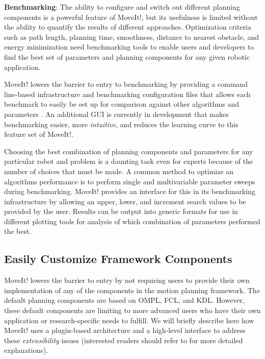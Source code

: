 \documentclass[10pt,journal,compsoc]{joser1}
\begin{document}
{{\bf Benchmarking}: The ability to configure and switch out different planning
components is a powerful feature of MoveIt!, but its usefulness is limited
without the ability to quantify the results of different approaches.
Optimization criteria such as path length, planning time, smoothness, distance
to nearest obstacle, and energy minimization need benchmarking tools to enable
users and developers to find the best set of parameters and planning components
for any given robotic application.

MoveIt! lowers the barrier to entry to benchmarking by providing a command
line-based infrastructure and benchmarking configuration files that allows each
benchmark to easily be set up for comparison against other algorithms and
parameters \cite{cohen2012generic}. An additional GUI is currently in
development that makes benchmarking easier, more \textit{intuitive}, and reduces
the learning curve to this feature set of MoveIt!.

Choosing the best combination of planning components and parameters for any
particular robot and problem is a daunting task even for experts because of the
number of choices that must be made\cite{cohen2012generic}. A common method to
optimize an algorithms performance is to perform single and multivariable
parameter sweeps during benchmarking. MoveIt! provides an interface for this in
its benchmarking infrastructure by allowing an upper, lower, and increment
search values to be provided by the user. Results can be output into generic
formats for use in different plotting tools for analysis of which combination of
parameters performed the best.

\subsection{Easily Customize Framework Components}
\label{subsec:extensiblity}

MoveIt! lowers the barrier to entry by not requiring users to provide their own
implementation of any of the components in the motion planning framework. The
default planning components are based on OMPL, FCL, and KDL. However, these
default components are limiting to more advanced users who have their own
application or research-specific needs to fulfill. We will briefly describe here
how MoveIt! uses a plugin-based architecture and a high-level interface to
address these \textit{extensibility} issues (interested readers should refer to
\cite{moveit} for more detailed explanations). 

}
\end{document}
